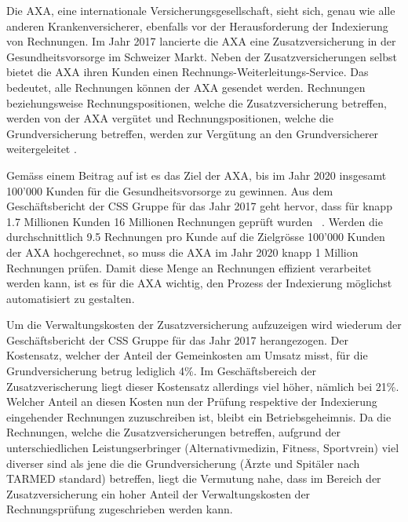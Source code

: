 \documentclass{hwz}
\begin{document}

Die AXA, eine internationale Versicherungsgesellschaft, sieht sich, genau wie alle anderen Krankenversicherer, ebenfalls vor der Herausforderung der Indexierung von Rechnungen. Im Jahr 2017 lancierte die AXA eine Zusatzversicherung in der Gesundheitsvorsorge im Schweizer Markt. Neben der Zusatzversicherungen selbst bietet die AXA ihren Kunden einen Rechnungs-Weiterleitungs-Service. Das bedeutet, alle Rechnungen können der AXA gesendet werden. Rechnungen beziehungsweise Rechnungspositionen, welche die Zusatzversicherung betreffen, werden von der AXA vergütet und Rechnungspositionen, welche die Grundversicherung betreffen, werden zur Vergütung an den Grundversicherer weitergeleitet \autocite{finanzen.ch2017AxaGewinnen}.

Gemäss einem Beitrag auf \textcite{finanzen.ch2017AxaGewinnen} ist es das Ziel der AXA, bis im Jahr 2020 insgesamt 100'000 Kunden für die Gesundheitsvorsorge zu gewinnen. Aus dem Geschäftsbericht der CSS Gruppe für das Jahr 2017 geht hervor, dass für knapp 1.7 Millionen Kunden 16 Millionen Rechnungen geprüft wurden~ \autocite{CSSGruppe2018Geschaftsbericht2017}. Werden die durchschnittlich 9.5 Rechnungen pro Kunde auf die Zielgrösse 100'000 Kunden der AXA hochgerechnet, so muss die AXA im Jahr 2020 knapp 1 Million Rechnungen prüfen. Damit diese Menge an Rechnungen effizient verarbeitet werden kann, ist es für die AXA wichtig, den Prozess der Indexierung möglichst automatisiert zu gestalten.

Um die Verwaltungskosten der Zusatzversicherung aufzuzeigen wird wiederum der Ge\-schäfts\-be\-richt der CSS Gruppe für das Jahr 2017 herangezogen. Der Kostensatz, welcher der Anteil der Gemeinkosten am Umsatz misst, für die Grundversicherung betrug lediglich 4\%. Im Geschäftsbereich der Zusatzverischerung liegt dieser Kostensatz allerdings viel höher, nämlich bei 21\%. Welcher Anteil an diesen Kosten nun der Prüfung respektive der Indexierung eingehender Rechnungen zuzuschreiben ist, bleibt ein Betriebsgeheimnis. Da die Rechnungen, welche die Zusatzversicherungen betreffen, aufgrund der unterschiedlichen Leistungserbringer (Alternativmedizin, Fitness, Sportvrein) viel diverser sind als jene die die Grundversicherung (Ärzte und Spitäler nach TARMED standard) betreffen, liegt die Vermutung nahe, dass im Bereich der Zusatzversicherung ein hoher Anteil der Verwaltungskosten der Rechnungsprüfung zugeschrieben werden kann.
\end{document}
